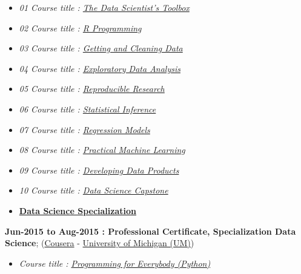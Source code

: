 \documentclass[]{article}
\providecommand{\tightlist}{%
  \setlength{\itemsep}{0pt}\setlength{\parskip}{0pt}}
\begin{document}
\begin{itemize}
\tightlist
\item
  \emph{01 Course title :
  \href{https://www.coursera.org/account/accomplishments/records/AjMdkzyHyA2JWRRL}{The
  Data Scientist's Toolbox}}
\item
  \emph{02 Course title :
  \href{https://www.coursera.org/account/accomplishments/certificate/VBB2XUA29B}{R
  Programming}}
\item
  \emph{03 Course title :
  \href{https://www.coursera.org/account/accomplishments/records/Q5HBLbpBekrW43Jd}{Getting
  and Cleaning Data}}
\item
  \emph{04 Course title :
  \href{https://www.coursera.org/account/accomplishments/records/4Gz8BmPsnuknW93A}{Exploratory
  Data Analysis}}
\item
  \emph{05 Course title :
  \href{https://www.coursera.org/account/accomplishments/records/xpNfvxWs8uMMYrjs}{Reproducible
  Research}}
\item
  \emph{06 Course title :
  \href{https://www.coursera.org/account/accomplishments/records/jXzs4bAFXZfJ3Dne}{Statistical
  Inference}}
\item
  \emph{07 Course title :
  \href{https://www.coursera.org/account/accomplishments/records/Su7PgrMXVGYrU4cM}{Regression
  Models}}
\item
  \emph{08 Course title :
  \href{https://www.coursera.org/account/accomplishments/records/j6DpQhLYeRj54dvS}{Practical
  Machine Learning}}
\item
  \emph{09 Course title :
  \href{https://www.coursera.org/account/accomplishments/records/ERvuyAZm6CG45EUS}{Developing
  Data Products}}
\item
  \emph{10 Course title :
  \href{https://www.coursera.org/account/accomplishments/specialization/RRYWVWNAP5EB}{Data
  Science Capstone}}
\item
  \href{https://www.coursera.org/account/accomplishments/specialization/RRYWVWNAP5EB}{\textbf{Data
  Science Specialization}}
\end{itemize}

\textbf{Jun-2015 to Aug-2015 : Professional Certificate, Specialization
Data Science}; (\href{http://www.coursera.org}{Cousera} -
\href{https://www.umich.edu/}{University of Michigan (UM)})

\begin{itemize}
\tightlist
\item
  \emph{Course title :
  \href{https://www.coursera.org/account/accomplishments/records/GA4cGW59ETHAevCa}{Programming
  for Everybody (Python)}}
\end{itemize}
\end{document}
